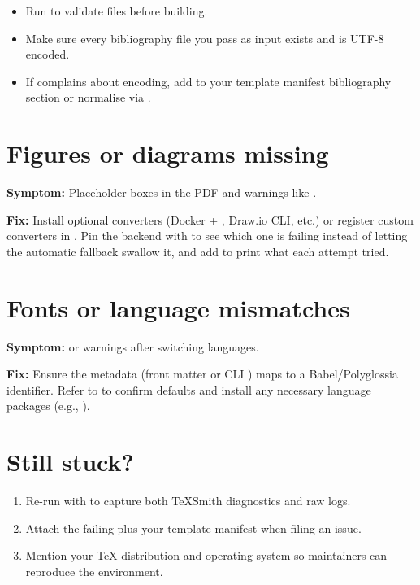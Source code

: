 \documentclass[a4paper,twoside]{article}
\begin{document}
\begin{itemize}
\item Run  to validate files before building.
\item Make sure every bibliography file you pass as input exists and is UTF-8 encoded.
\item If  complains about encoding, add  to your template manifest bibliography section or normalise via .
\end{itemize}
\section{Figures or diagrams missing}
\textbf{Symptom:} Placeholder boxes in the PDF and warnings like .

\textbf{Fix:} Install optional converters (Docker + , Draw.io CLI, etc.) or register custom converters in . Pin the backend with  to see which one is failing instead of letting the automatic fallback swallow it, and add  to print what each attempt tried.
\section{Fonts or language mismatches}
\textbf{Symptom:}  or  warnings after switching languages.

\textbf{Fix:} Ensure the  metadata (front matter or CLI ) maps to a Babel/Polyglossia identifier. Refer to  to confirm defaults and install any necessary language packages (e.g., ).
\section{Still stuck?}
\begin{enumerate}
\item Re-run with  to capture both TeXSmith diagnostics and raw  logs.
\item Attach the failing  plus your template manifest when filing an issue.
\item Mention your \TeX{} distribution and operating system so maintainers can reproduce the environment.
\end{enumerate}
\end{document}
